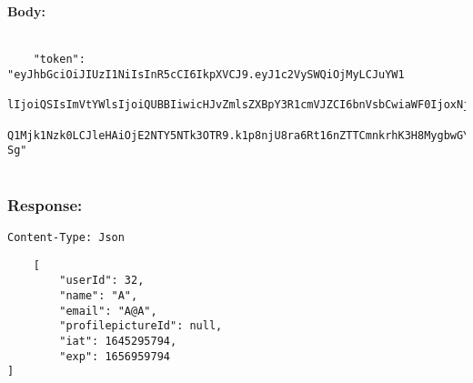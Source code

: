 \paragraph{Body:}

\begin{lstlisting}

    "token": "eyJhbGciOiJIUzI1NiIsInR5cCI6IkpXVCJ9.eyJ1c2VySWQiOjMyLCJuYW1
    lIjoiQSIsImVtYWlsIjoiQUBBIiwicHJvZmlsZXBpY3R1cmVJZCI6bnVsbCwiaWF0IjoxNj
    Q1Mjk1Nzk0LCJleHAiOjE2NTY5NTk3OTR9.k1p8njU8ra6Rt16nZTTCmnkrhK3H8MygbwGYHtio-Sg"
    
\end{lstlisting}

\subsubsection{Response:}

\lstinline{Content-Type: Json}
\begin{lstlisting}
    [
        "userId": 32,
        "name": "A",
        "email": "A@A",
        "profilepictureId": null,
        "iat": 1645295794,
        "exp": 1656959794
]
\end{lstlisting}